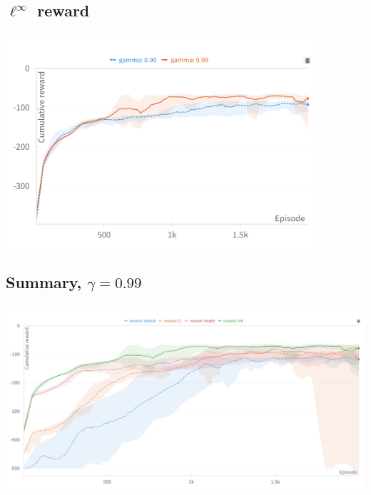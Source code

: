 \documentclass[
  letterpaper,
  DIV=11,
  numbers=noendperiod,
  oneside]{scrartcl}
\begin{document}

\subsection{\texorpdfstring{\(\ell^\infty\)
reward}{\textbackslash ell\^{}\textbackslash infty reward}}\label{ellinfty-reward}

\begin{center}
\includegraphics[width=\textwidth,height=3.125in]{figs/reward_linf.png}
\end{center}


\subsection{\texorpdfstring{Summary,
\(\gamma = 0.99\)}{Summary, \textbackslash gamma = 0.99}}\label{summary-gamma-0.99}

\begin{center}
\includegraphics{figs/reward_gamma_99_all.png}
\end{center}
\end{document}
